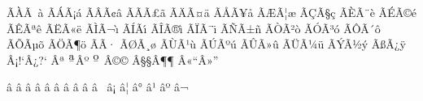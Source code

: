 \def\tura#1{{\edef\scf@{\the\scriptfont\fam}%
 \ifdim\fontdimen6\scf@=0pt\else\scf@\fi $^{\hbox{\b{#1}}}$}}

\def\dotexA{%
 \do^^c3^^80{\`A}\do^^c3^^a0{\`a}%
 \do^^c3^^81{\'A}\do^^c3^^a1{\'a}%
 \do^^c3^^82{\^A}\do^^c3^^a2{\^a}%
 \do^^c3^^83{\~A}\do^^c3^^a3{\~a}%
 \do^^c3^^84{\"A}\do^^c3^^a4{\"a}%
 \do^^c3^^85{\AA}\do^^c3^^a5{\aa}%
 \do^^c3^^86{\AE}\do^^c3^^a6{\ae}%
 \do^^c3^^87{\c C}\do^^c3^^a7{\c c}%
 \do^^c3^^88{\`E}\do^^c3^^a8{\`e}%
 \do^^c3^^89{\'E}\do^^c3^^a9{\'e}%
 \do^^c3^^8a{\^E}\do^^c3^^aa{\^e}%
 \do^^c3^^8b{\"E}\do^^c3^^ab{\"e}%
 \do^^c3^^8c{\`I}\do^^c3^^ac{\`\i}%
 \do^^c3^^8d{\'I}\do^^c3^^ad{\'\i}%
 \do^^c3^^8e{\^I}\do^^c3^^ae{\^\i}%
 \do^^c3^^8f{\"I}\do^^c3^^af{\"\i}%
 \do^^c3^^91{\~N}\do^^c3^^b1{\~n}%
 \do^^c3^^92{\`O}\do^^c3^^b2{\`o}%
 \do^^c3^^93{\'O}\do^^c3^^b3{\'o}%
 \do^^c3^^94{\^O}\do^^c3^^b4{\^o}%
 \do^^c3^^95{\~O}\do^^c3^^b5{\~o}%
 \do^^c3^^96{\"O}\do^^c3^^b6{\"o}%
 \do^^c3^^97{\times}\do^^c3^^b7{\div}%
 \do^^c3^^98{\O}\do^^c3^^b8{\o}%
 \do^^c3^^99{\`U}\do^^c3^^b9{\`u}%
 \do^^c3^^9a{\'U}\do^^c3^^ba{\'u}%
 \do^^c3^^9b{\^U}\do^^c3^^bb{\^u}%
 \do^^c3^^9c{\"U}\do^^c3^^bc{\"u}%
 \do^^c3^^9d{\'Y}\do^^c3^^bd{\'y}
 \do^^c3^^9f{\ss}\do^^c3^^bf{\"y}%
 \do^^c2^^a1{!`}\do^^c2^^bf{?`}%
 \do^^c2^^aa{\tura a}\do^^c2^^ba{\tura o}%
 \do^^c2^^a9{\copyright}%
 \do^^c2^^a7{\S}\do^^c2^^b6{\P}%
 \do^^c2^^ab{``}\do^^c2^^bb{''}%
}

\def\do#1#2#3{\expandafter\def
 \csname\string#1\string#2@tex\endcsname{#3}}\dotexA

\def\doutfB{%
 \do^^e2^^80^^92%
 \do^^e2^^80^^93%
 \do^^e2^^80^^94%
 \do^^e2^^80^^98%
 \do^^e2^^80^^99%
 \do^^e2^^80^^9a%
 \do^^e2^^80^^9c%
 \do^^e2^^80^^9d%
 \do^^e2^^80^^9e%
 \do^^e2^^80^^a0%
 \do^^e2^^80^^a1%
 \do^^e2^^80^^a6%
 \do^^e2^^80^^b0%
 \do^^e2^^80^^b9%
 \do^^e2^^80^^ba%
 \do^^e2^^82^^ac%
}

\def\do#1#2#3{\expandafter\def
 \csname\string#1\string#2\string#3@utf\endcsname{\string#1\string#2\string#3}}\doutfB

